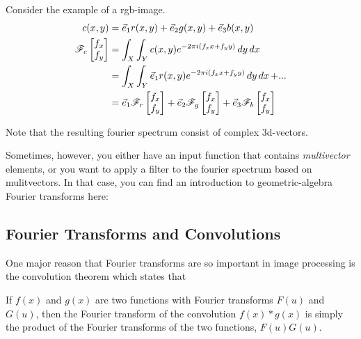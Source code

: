 Consider the example of a rgb-image.
\begin{equation}
    \begin{split}
        c(x,y) &= \vec{e}_1 r(x,y) + \vec{e}_2 g(x,y) + \vec{e}_3 b(x,y) \\
        \mathscr{F}_c\begin{bmatrix} f_x \\ f_y \end{bmatrix} 
                        &= \int_X \int_Y c(x,y) e^{-2\pi i (f_xx + f_yy)} \mathop{dy} \mathop{dx} \\
                        &= \int_X \int_Y \vec{e}_1 r(x,y) e^{-2\pi i (f_xx + f_yy)} \mathop{dy} \mathop{dx} + ... \\
                        &= \vec{e}_1 \mathscr{F}_r\begin{bmatrix} f_x \\ f_y \end{bmatrix} + \vec{e}_2 \mathscr{F}_g\begin{bmatrix} f_x \\ f_y \end{bmatrix} + \vec{e}_3 \mathscr{F}_b\begin{bmatrix} f_x \\ f_y \end{bmatrix} 
    \end{split}
\end{equation}

Note that the resulting fourier spectrum consist of complex 3d-vectors.

Sometimes, however, you either have an input function that contains \emph{multivector} elements, or you want to apply a filter to the fourier spectrum based on mulitvectors. In that case, you can find an introduction to geometric-algebra Fourier transforms here: 



\subsection{Fourier Transforms and Convolutions}
One major reason that Fourier transforms are so important in image processing is the convolution theorem which states that

If $f(x)$ and $g(x)$ are two functions with Fourier transforms $F(u)$ and $G(u)$, then the Fourier transform of the convolution $f(x)*g(x)$ is simply the product of the Fourier transforms of the two functions, $F(u) G(u)$.

